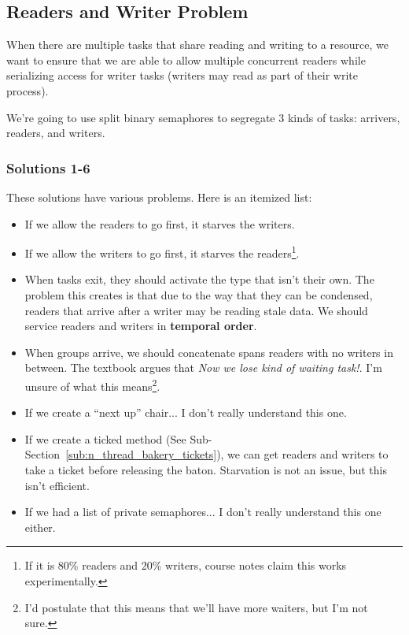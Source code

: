             \subsection{Readers and Writer Problem} %
            \label{sub:readers_and_writer_problem}
                When there are multiple tasks that share reading and writing to a resource, we want to ensure that we are able to allow multiple concurrent readers while serializing access for writer tasks (writers may read as part of their write process).

                We're going to use split binary semaphores to segregate 3 kinds of tasks: arrivers, readers, and writers.

                \subsubsection{Solutions 1-6} %
                \label{ssub:solutions_1_6}
                    These solutions have various problems.
                    Here is an itemized list:
                    \begin{itemize}
                        \item If we allow the readers to go first, it starves the writers.
                        \item If we allow the writers to go first, it starves the readers\footnote{If it is 80\% readers and 20\% writers, course notes claim this works experimentally.}.
                        \item When tasks exit, they should activate the type that isn't their own.
                        The problem this creates is that due to the way that they can be condensed, readers that arrive after a writer may be reading stale data.
                        We should service readers and writers in \textbf{temporal order}.
                        \item When groups arrive, we should concatenate spans readers with no writers in between.
                        The textbook argues that \textit{Now we lose kind of waiting task!}.
                        I'm unsure of what this means\footnote{I'd postulate that this means that we'll have more waiters, but I'm not sure.}.
                        \item If we create a ``next up'' chair... I don't really understand this one. %
                        \item If we create a ticked method (See Sub-Section~\ref{sub:n_thread_bakery_tickets}), we can get readers and writers to take a ticket before releasing the baton.
                        Starvation is not an issue, but this isn't efficient.
                        \item If we had a list of private semaphores... I don't really understand this one either. %
                    \end{itemize}

